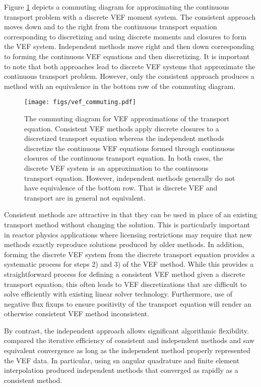 \documentclass[../doc.tex]{subfiles}
\begin{document}
Figure \ref{vef:commuting} depicts a commuting diagram for approximating the continuous transport problem with a discrete VEF moment system. The consistent approach moves down and to the right from the continuous transport equation corresponding to discretizing and using discrete moments and closures to form the VEF system. Independent methods move right and then down corresponding to forming the continuous VEF equations and then discretizing. It is important to note that both approaches lead to discrete VEF systems that approximate the continuous transport problem. However, only the consistent approach produces a method with an equivalence in the bottom row of the commuting diagram.
\begin{figure}
\centering
\texttt{[image: figs/vef\_commuting.pdf]}
\caption{The commuting diagram for VEF approximations of the transport equation. Consistent VEF methods apply discrete closures to a discretized transport equation whereas the independent methods discretize the continuous VEF equations formed through continuous closures of the continuous transport equation. In both cases, the discrete VEF system is an approximation to the continuous transport equation. However, independent methods generally do not have equivalence of the bottom row. That is discrete VEF and transport are in general not equivalent.}
\label{vef:commuting}
\end{figure}

Consistent methods are attractive in that they can be used in place of an existing transport method without changing the solution. This is particularly important in reactor physics applications where licensing restrictions may require that new methods exactly reproduce solutions produced by older methods. In addition, forming the discrete VEF system from the discrete transport equation provides a systematic process for steps 2) and 3) of the VEF method. While this provides a straightforward process for defining a consistent VEF method given a discrete transport equation, this often leads to VEF discretizations that are difficult to solve efficiently with existing linear solver technology. Furthermore, use of negative flux fixups to ensure positivity of the transport equation will render an otherwise consistent VEF method inconsistent. 

By contrast, the independent approach allows significant algorithmic flexibility. 
\textcite{two-level-independent-warsa} compared the iterative efficiency of consistent and independent methods and saw equivalent convergence as long as the independent method properly represented the VEF data. In particular, using \gls{sn} angular quadrature and finite element interpolation produced independent methods that converged as rapidly as a consistent method. 
\end{document}
